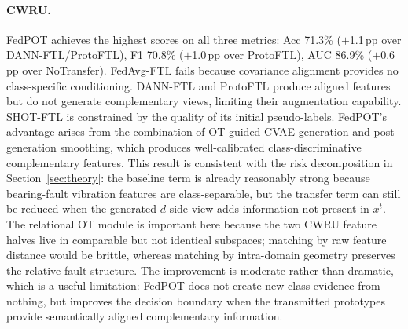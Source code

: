 \documentclass[a4paper,fleqn]{cas-sc}
\begin{document}
\paragraph{CWRU.}
FedPOT achieves the highest scores on all three metrics:
Acc 71.3\% ($+$1.1\,pp over DANN-FTL/ProtoFTL),
F1 70.8\% ($+$1.0\,pp over ProtoFTL), AUC 86.9\%
($+$0.6\,pp over NoTransfer).
FedAvg-FTL fails because covariance alignment provides no class-specific
conditioning.
DANN-FTL and ProtoFTL produce aligned features but do not generate
complementary views, limiting their augmentation capability.
SHOT-FTL is constrained by the quality of its initial pseudo-labels.
FedPOT's advantage arises from the combination of OT-guided CVAE
generation and post-generation smoothing, which produces well-calibrated
class-discriminative complementary features.
This result is consistent with the risk decomposition in
Section~\ref{sec:theory}: the baseline term is already reasonably strong
because bearing-fault vibration features are class-separable, but the
transfer term can still be reduced when the generated $d$-side view
adds information not present in $x^t$. The relational OT module is
important here because the two CWRU feature halves live in comparable but
not identical subspaces; matching by raw feature distance would be brittle,
whereas matching by intra-domain geometry preserves the relative fault
structure. The improvement is moderate rather than dramatic, which is a
useful limitation: FedPOT does not create new class evidence from nothing,
but improves the decision boundary when the transmitted prototypes provide
semantically aligned complementary information.
\end{document}
